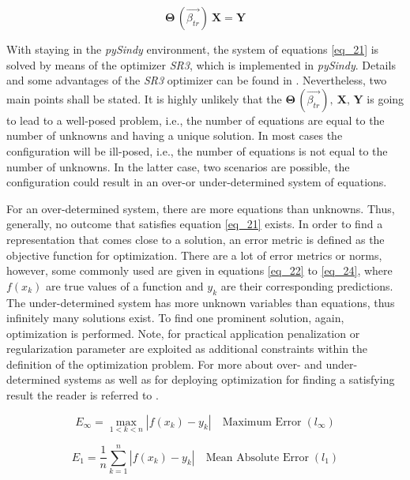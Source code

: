 \begin{equation}
    \boldsymbol{\Theta}\,(\vec{\beta_{tr}}) \: \bm X = \bm Y
    \label{eq_21}
\end{equation}

With staying in the \emph{pySindy} environment, the system of equations \eqref{eq_21} is solved by means of the optimizer \emph{SR3}, which is implemented in  \emph{pySindy}.
Details and some advantages of the  \emph{SR3}  optimizer can be found in \cite{SR3}. Nevertheless, two main points shall be stated. 
It is highly unlikely that the $\boldsymbol{\Theta}\,(\vec{\beta_{tr}}),\: \bm X,\, \bm Y$ is going to lead to a well-posed problem, i.e., the number of equations are equal to the number of unknowns and having a unique solution.
In most cases the configuration will be ill-posed, i.e., the number of equations is not equal to the number of unknowns. 
In the latter case, two scenarios are possible, the configuration could result in an over-or under-determined system of equations.\newline 

For an over-determined system, there are more equations than unknowns. 
Thus,  generally, no outcome that satisfies equation \eqref{eq_21} exists.
In order to find a representation that comes close to a solution, an error metric is defined as the objective function for optimization.
There are a lot of error metrics or norms, however, some commonly used \cite{Brunton2019} are given in equations \eqref{eq_22} to \eqref{eq_24}, where $f(x_k)$ are true values of a function and $y_k$ are their corresponding predictions.
The under-determined system has more unknown variables than equations, thus infinitely many solutions exist. 
To find one prominent solution, again, optimization is performed.
Note, for practical application penalization or regularization parameter are exploited as additional constraints within the definition of the optimization problem. 
For more about over- and under-determined systems as well as for deploying optimization for finding a satisfying result the reader is referred to \cite{Brunton2019}.\newline

\begin{equation}
    E_{\infty} = \max_{1<k<n} |f(x_k) -y_k | \quad \text{Maximum Error} \;(l_{\infty})
    \label{eq_22}
\end{equation}

\vspace{0.1cm}
\begin{equation}
    E_{1} = \frac{1}{n} \sum_{k=1}^{n} |f(x_k) -y_k | \quad \text{Mean Absolute Error} \;(l_{1})
    \label{eq_23}
\end{equation}

